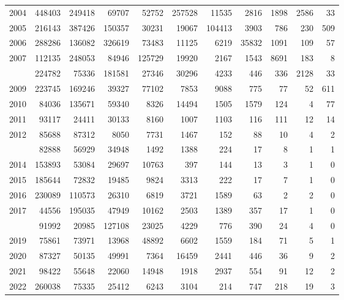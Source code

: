 \documentclass[
]{article}
\begin{document}
\begin{longtable}[t]{lrrrrrrrrrr}
2004 & 448403 & 249418 & 69707 & 52752 & 257528 & 11535 & 2816 & 1898 & 2586 & 33\\
2005 & 216143 & 387426 & 150357 & 30231 & 19067 & 104413 & 3903 & 786 & 230 & 509\\
2006 & 288286 & 136082 & 326619 & 73483 & 11125 & 6219 & 35832 & 1091 & 109 & 57\\
2007 & 112135 & 248053 & 84946 & 125729 & 19920 & 2167 & 1543 & 8691 & 183 & 8\\
\addlinespace
2008 & 224782 & 75336 & 181581 & 27346 & 30296 & 4233 & 446 & 336 & 2128 & 33\\
2009 & 223745 & 169246 & 39327 & 77102 & 7853 & 9088 & 775 & 77 & 52 & 611\\
2010 & 84036 & 135671 & 59340 & 8326 & 14494 & 1505 & 1579 & 124 & 4 & 77\\
2011 & 93117 & 24411 & 30133 & 8160 & 1007 & 1103 & 116 & 111 & 12 & 14\\
2012 & 85688 & 87312 & 8050 & 7731 & 1467 & 152 & 88 & 10 & 4 & 2\\
\addlinespace
2013 & 82888 & 56929 & 34948 & 1492 & 1388 & 224 & 17 & 8 & 1 & 1\\
2014 & 153893 & 53084 & 29697 & 10763 & 397 & 144 & 13 & 3 & 1 & 0\\
2015 & 185644 & 72832 & 19485 & 9824 & 3313 & 222 & 17 & 7 & 1 & 0\\
2016 & 230089 & 110573 & 26310 & 6819 & 3721 & 1589 & 63 & 2 & 2 & 0\\
2017 & 44556 & 195035 & 47949 & 10162 & 2503 & 1389 & 357 & 17 & 1 & 0\\
\addlinespace
2018 & 91992 & 20985 & 127108 & 23025 & 4229 & 776 & 390 & 24 & 4 & 0\\
2019 & 75861 & 73971 & 13968 & 48892 & 6602 & 1559 & 184 & 71 & 5 & 1\\
2020 & 87327 & 50135 & 49991 & 7364 & 16459 & 2441 & 446 & 36 & 9 & 2\\
2021 & 98422 & 55648 & 22060 & 14948 & 1918 & 2937 & 554 & 91 & 12 & 2\\
2022 & 260038 & 75335 & 25412 & 6243 & 3104 & 214 & 747 & 218 & 19 & 3\\*
\end{longtable}
\end{document}
